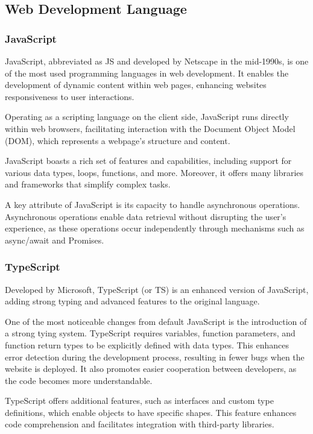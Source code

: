 \documentclass[12pt,oneside,openright,a4paper]{cpe-english-project}
\begin{document}
    \subsection{Web Development Language}
      \subsubsection{JavaScript}
        \qquad JavaScript, abbreviated as JS and developed by Netscape in the mid-1990s, is one of the most used programming languages in web development. It enables the development of dynamic content within web pages, enhancing websites responsiveness to user interactions.\par
        \qquad Operating as a scripting language on the client side, JavaScript runs directly within web browsers, facilitating interaction with the Document Object Model (DOM), which represents a webpage's structure and content.\par
        \qquad JavaScript boasts a rich set of features and capabilities, including support for various data types, loops, functions, and more. Moreover, it offers many libraries and frameworks that simplify complex tasks.\par
        \qquad A key attribute of JavaScript is its capacity to handle asynchronous operations. Asynchronous operations enable data retrieval without disrupting the user’s experience, as these operations occur independently through mechanisms such as async/await and Promises.\par
      \subsubsection{TypeScript}
        \qquad Developed by Microsoft, TypeScript (or TS) is an enhanced version of JavaScript, adding strong typing and advanced features to the original language.\par
        \qquad One of the most noticeable changes from default JavaScript is the introduction of a strong tying system. TypeScript requires variables, function parameters, and function return types to be explicitly defined with data types. This enhances error detection during the development process, resulting in fewer bugs when the website is deployed. It also promotes easier cooperation between developers, as the code becomes more understandable.\par
        \qquad TypeScript offers additional features, such as interfaces and custom type definitions, which enable objects to have specific shapes. This feature enhances code comprehension and facilitates integration with third-party libraries.\par
      \newpage
\end{document}
